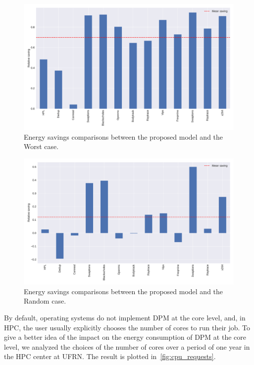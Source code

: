 \begin{figure}[H]
	\centering
	\includegraphics[width=\columnwidth]{models/figures/dvfs_cmp_max.pdf}
	\caption{Energy savings comparisons between the proposed model and the Worst case.}
	\label{fig:energy_worst_case}
\end{figure}

\begin{figure}[H]
	\centering
	\includegraphics[width=\columnwidth]{models/figures/dvfs_cmp_mean.pdf}
	\caption{Energy savings comparisons between the proposed model and the Random case.}
	\label{fig:energy_mean_case}
\end{figure}

By default, operating systems do not implement DPM at the core level, and, in HPC, the user usually explicitly chooses the number of cores to run their job. To give a better idea of the impact on the energy consumption of DPM at the core level, we analyzed the choices of the number of cores over a period of one year in the HPC center at UFRN. The result is plotted in~\cref{fig:cpu_requests}.


